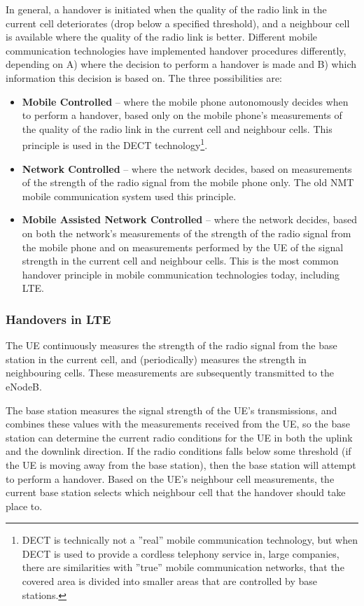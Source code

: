 In general, a handover is initiated when the quality of the radio link in the current cell deteriorates (\eg drop below a specified threshold), and a neighbour cell is available where the quality of the radio link is better. Different mobile communication technologies have implemented handover procedures differently, depending on A) where the decision to perform a handover is made and B) which information this decision is based on. The three possibilities are:

\begin{itemize}
%
\item\textbf{Mobile Controlled} -- where the mobile phone autonomously decides when to perform a handover, based only on the mobile phone's measurements of the quality of the radio link in the current cell and neighbour cells. This principle is used in the DECT technology\footnote{DECT is technically not a ''real'' mobile communication technology, but when DECT is used to provide a cordless telephony service in, \eg large companies, there are similarities with ''true'' mobile communication networks, \eg that the covered area is divided into smaller areas that are controlled by base stations.}.
%
\item\textbf{Network Controlled} -- where the network decides, based on measurements of the strength of the radio signal from the mobile phone only. The old NMT mobile communication system used this principle.
%
\item\textbf{Mobile Assisted Network Controlled} -- where the network decides, based on both the network's measurements of the strength of the radio signal from the mobile phone and on measurements performed by the UE of the signal strength in the current cell and neighbour cells. This is the most common handover principle in mobile communication technologies today, including LTE.
%
\end{itemize}

\subsubsection{Handovers in LTE}
The UE continuously measures the strength of the radio signal from the base station in the current cell, and (periodically) measures the strength in neighbouring cells. These measurements are subsequently transmitted to the eNodeB.

The base station measures the signal strength of the UE's transmissions, and combines these values with the measurements received from the UE, so the base station can determine the current radio conditions for the UE in both the uplink and the downlink direction. If the radio conditions falls below some threshold (\eg if the UE is moving away from the base station), then the base station will attempt to perform a handover. Based on the UE's neighbour cell measurements, the current base station selects which neighbour cell that the handover should take place to.

